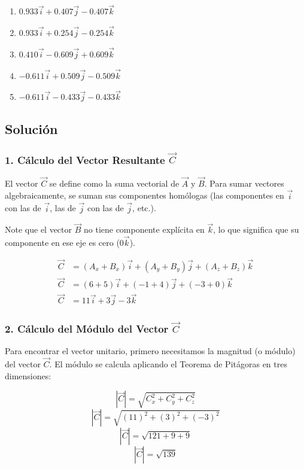 \documentclass[12pt, a4paper]{article}
\begin{document}
\begin{enumerate}[label=\alph*)]
    \item $0.933\vec{i} + 0.407\vec{j} - 0.407\vec{k}$
    \item $0.933\vec{i} + 0.254\vec{j} - 0.254\vec{k}$
    \item $0.410\vec{i} - 0.609\vec{j} + 0.609\vec{k}$
    \item $-0.611\vec{i} + 0.509\vec{j} - 0.509\vec{k}$
    \item $-0.611\vec{i} - 0.433\vec{j} - 0.433\vec{k}$
\end{enumerate}

\subsection*{Solución}

\subsubsection*{1. Cálculo del Vector Resultante $\vec{C}$}
El vector $\vec{C}$ se define como la suma vectorial de $\vec{A}$ y $\vec{B}$. Para sumar vectores algebraicamente, se suman sus componentes homólogas (las componentes en $\vec{i}$ con las de $\vec{i}$, las de $\vec{j}$ con las de $\vec{j}$, etc.). 

Note que el vector $\vec{B}$ no tiene componente explícita en $\vec{k}$, lo que significa que su componente en ese eje es cero ($0\vec{k}$).

\begin{align*}
    \vec{C} &= (A_x + B_x)\vec{i} + (A_y + B_y)\vec{j} + (A_z + B_z)\vec{k} \\
    \vec{C} &= (6 + 5)\vec{i} + (-1 + 4)\vec{j} + (-3 + 0)\vec{k} \\
    \vec{C} &= 11\vec{i} + 3\vec{j} - 3\vec{k}
\end{align*}

\subsubsection*{2. Cálculo del Módulo del Vector $\vec{C}$}
Para encontrar el vector unitario, primero necesitamos la magnitud (o módulo) del vector $\vec{C}$. El módulo se calcula aplicando el Teorema de Pitágoras en tres dimensiones:

$$|\vec{C}| = \sqrt{C_x^2 + C_y^2 + C_z^2}$$
$$|\vec{C}| = \sqrt{(11)^2 + (3)^2 + (-3)^2}$$
$$|\vec{C}| = \sqrt{121 + 9 + 9}$$
$$|\vec{C}| = \sqrt{139}$$
\end{document}
